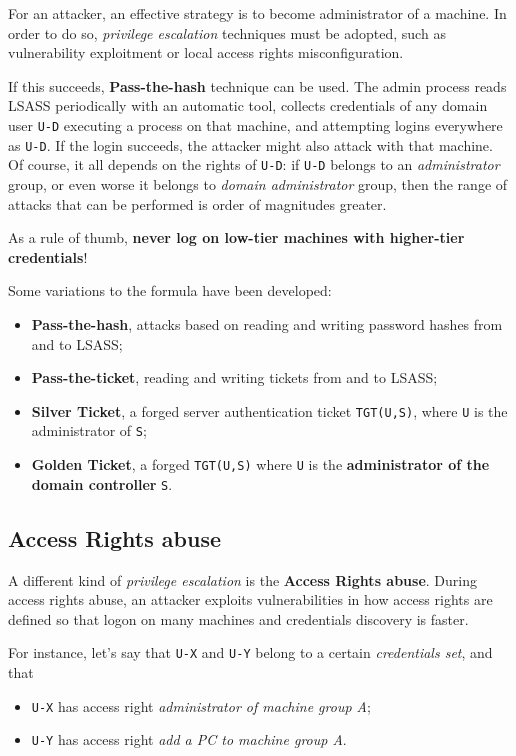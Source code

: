 \documentclass[10pt]{\classname}
\begin{document}
For an attacker, an effective strategy is to become administrator of a machine.
In order to do so, \emph{privilege escalation} techniques must be adopted, such
as vulnerability exploitment or local access rights misconfiguration.

If this succeeds, \textbf{Pass\--the\--hash} technique can be used. The admin
process reads LSASS periodically with an automatic tool, collects credentials
of any domain user \texttt{U-D} executing a process on that machine, and
attempting logins everywhere as \texttt{U-D}. If the login succeeds, the
attacker might also attack with that machine. Of course, it all depends on the
rights of \texttt{U-D}: if \texttt{U-D} belongs to an \emph{administrator}
group, or even worse it belongs to \emph{domain administrator} group, then the
range of attacks that can be performed is order of magnitudes greater.

As a rule of thumb, \textbf{never log on low\--tier machines with higher\--tier
credentials}!

Some variations to the formula have been developed:
\begin{itemize}
    \item \textbf{Pass\--the\--hash}, attacks based on reading and writing
        password hashes from and to LSASS;
    \item \textbf{Pass\--the\--ticket}, reading and writing tickets from and to
        LSASS;
    \item \textbf{Silver Ticket}, a forged server authentication ticket
        \texttt{TGT(U,S)}, where \texttt{U} is the administrator of \texttt{S};
    \item \textbf{Golden Ticket}, a forged \texttt{TGT(U,S)} where \texttt{U}
        is the \textbf{administrator of the domain controller} \texttt{S}.
\end{itemize}

\subsection{Access Rights abuse}

A different kind of \emph{privilege escalation} is the \textbf{Access Rights
abuse}. During access rights abuse, an attacker exploits vulnerabilities in how
access rights are defined so that logon on many machines and credentials
discovery is faster.


For instance, let's say that \texttt{U-X} and \texttt{U-Y} belong to a certain
\emph{credentials set}, and that
\begin{itemize}
    \item \texttt{U-X} has access right \emph{administrator of machine group
        A};
    \item \texttt{U-Y} has access right \emph{add a PC to machine group A}.
\end{itemize}
\end{document}
